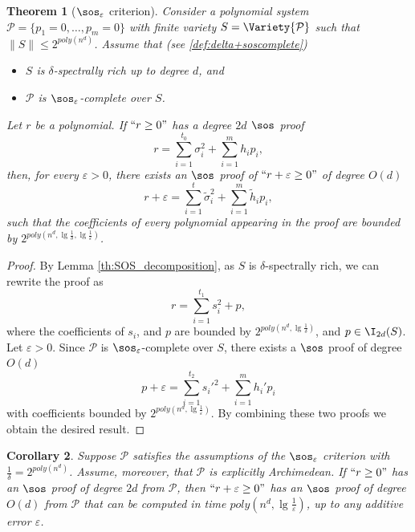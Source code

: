 \documentclass[11pt]{article}
\newtheorem{theorem}{Theorem}[section]
\newtheorem{corollary}[theorem]{Corollary}
\begin{document}
\begin{theorem}[$\sos_{\varepsilon}$ criterion]\label{th:SoS_Criterion}
    Consider a polynomial system $\mathcal{P}=\{p_1 = 0, \dots, p_m = 0\}$ with finite variety $S = \Variety{\mathcal{P}}$ such that $\| S \| \leq 2^{poly(n^d)}$.
    Assume that (see \cref{def:delta+soscomplete})
    \begin{itemize}
        \item [1)] $S$ is $\delta$-spectrally rich up to degree $d$, and
        \item [2)] $\mathcal{P}$ is $\sos_\varepsilon$-complete over $S$.
    \end{itemize}
    Let $r$ be a polynomial. If $``r \geq 0"$ has a degree $2d$ $\sos$ proof
    \begin{equation*}
        r = \sum_{i=1}^{t_0} \sigma_i^2 + \sum_{i=1}^m h_i p_i,
    \end{equation*}
    then, for every $\varepsilon>0$, there exists an $\sos$ proof of $``r+\varepsilon \geq 0"$ of degree $O(d)$
    \begin{equation}\label{eqn:SOS_criterion}
        r +\varepsilon = \sum_{i=1}^{t} \tilde{\sigma}_i^2 + \sum_{i=1}^m \tilde{h}_i p_i,
    \end{equation}
    such that the coefficients of every polynomial appearing in the proof are bounded by $2^{poly(n^d, \lg \frac{1}{\delta}, \lg \frac{1}{\varepsilon})}$.
\end{theorem}

\begin{proof}
    By Lemma \ref{th:SOS_decomposition}, as $S$ is $\delta$-spectrally rich, we can rewrite the proof as 
     \begin{equation*}
            r = \sum_{i=1}^{t_1} s_i^2 + p,
        \end{equation*}
      where the coefficients of $s_i$, and $p$ are bounded by $2^{poly(n^d, \lg\frac{1}{\delta})}$, and $p\in \I_{2d}(S)$. Let $\varepsilon > 0$. Since $\mathcal{P}$ is $\sos_\varepsilon$-complete over $S$, there exists a $\sos$ proof of degree $O(d)$
      \begin{equation*}
          p+ \varepsilon = \sum_{i=1}^{t_2}s_i'^{2} + \sum_{i=1}^{m}h_i' p_i
      \end{equation*}
      with coefficients bounded by $2^{poly(n^d , \lg \frac{1}{\varepsilon})}$. By combining these two proofs we obtain the desired result.
\end{proof}

\begin{corollary}
    Suppose $\mathcal{P}$ satisfies the assumptions of the $\sos_\varepsilon$ criterion with $\frac{1}{\delta}=2^{poly(n^d)}$. Assume, moreover, that $\mathcal{P}$ is explicitly Archimedean. If $``r\geq 0"$ has an $\sos$ proof of degree $2d$ from $\mathcal{P}$, then $``r + \varepsilon \geq 0"$ has an $\sos$ proof of degree $O(d)$ from $\mathcal{P}$ that can be computed in time $poly(n^d, \lg \frac{1}{\varepsilon})$, up to any additive error $\varepsilon$.
\end{corollary}
\end{document}
